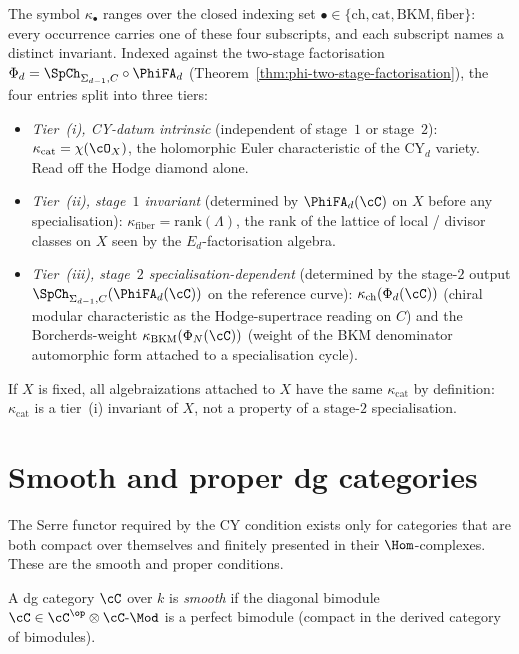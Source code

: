 \begin{remark}
\label{rem:cy-cat-kappa-convention}
The symbol $\kappa_\bullet$ ranges over the closed indexing set $\bullet \in \{\mathrm{ch}, \mathrm{cat}, \mathrm{BKM}, \mathrm{fiber}\}$: every occurrence carries one of these four subscripts, and each subscript names a distinct invariant. Indexed against the two-stage factorisation $\Phi_d = \SpCh_{\Sigma_{d-1},C} \circ \PhiFA_d$ (Theorem~\ref{thm:phi-two-stage-factorisation}), the four entries split into three tiers:
\begin{itemize}
 \item \emph{Tier~(i), CY-datum intrinsic} (independent of stage~$1$ or stage~$2$): $\kappa_{\mathrm{cat}} = \chi(\cO_X)$, the holomorphic Euler characteristic of the CY$_d$ variety. Read off the Hodge diamond alone.
 \item \emph{Tier~(ii), stage~$1$ invariant} (determined by $\PhiFA_d(\cC)$ on $X$ before any specialisation): $\kappa_{\mathrm{fiber}} = \mathrm{rank}(\Lambda)$, the rank of the lattice of local / divisor classes on $X$ seen by the $E_d$-factorisation algebra.
 \item \emph{Tier~(iii), stage~$2$ specialisation-dependent} (determined by the stage-$2$ output $\SpCh_{\Sigma_{d-1},C}(\PhiFA_d(\cC))$ on the reference curve): $\kappa_{\mathrm{ch}}(\Phi_d(\cC))$ (chiral modular characteristic as the Hodge-supertrace reading on $C$) and the Borcherds-weight $\kappa_{\mathrm{BKM}}(\Phi_{N}(\cC))$ (weight of the BKM denominator automorphic form attached to a specialisation cycle).
\end{itemize}
If $X$ is fixed, all algebraizations attached to $X$ have the same $\kappa_{\mathrm{cat}}$ by definition: $\kappa_{\mathrm{cat}}$ is a tier~(i) invariant of $X$, not a property of a stage-$2$ specialisation.
\end{remark}

\section{Smooth and proper dg categories}
\label{sec:smooth-proper-dg}

The Serre functor required by the CY condition exists only for categories
that are both compact over themselves and finitely presented in their
$\Hom$-complexes. These are the smooth and proper conditions.

\begin{definition}
\label{def:smooth-dg-cat}
A dg category $\cC$ over $k$ is \emph{smooth} if the diagonal bimodule $\cC \in \cC^{\op} \otimes \cC\text{-}\Mod$ is a perfect bimodule (compact in the derived category of bimodules).
\end{definition}


